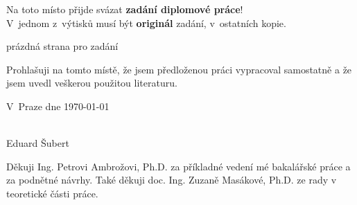 \documentclass[a4paper,11pt,twoside]{article}
\theoremstyle{definition}
\theoremstyle{remark}
\begin{document}

\clearpage
\thispagestyle{empty}
\cleardoublepage

\thispagestyle{empty}

\noindent
{\Large
Na toto místo přijde svázat \textbf{zadání diplomové práce}!\\
V~jednom z~výtisků musí být \textbf{originál} zadání, v~ostatních kopie.\par}
\newpage
prázdná strana pro zadání

\clearpage
\thispagestyle{empty}
\cleardoublepage

\thispagestyle{empty}



\vspace{0.5cm}

Prohlašuji na tomto místě, že jsem předloženou práci vypracoval samostatně 
a že jsem uvedl veškerou použitou literaturu.

\vspace{1.5cm}

\noindent
\begin{minipage}[b]{5cm}
V~Praze dne \today
\end{minipage}
\hfill
\begin{minipage}[t]{5cm}
\begin{center}
\dotfill\\
Eduard Šubert
\end{center}
\end{minipage}

\vspace*{2cm}


\clearpage
\thispagestyle{empty}
\cleardoublepage

\thispagestyle{empty}


Děkuji Ing. Petrovi Ambrožovi, Ph.D. za příkladné vedení mé bakalářské práce a za podnětné návrhy. Také děkuji doc. Ing. Zuzaně Masákové, Ph.D. ze rady v teoretické části práce.
\end{document}
